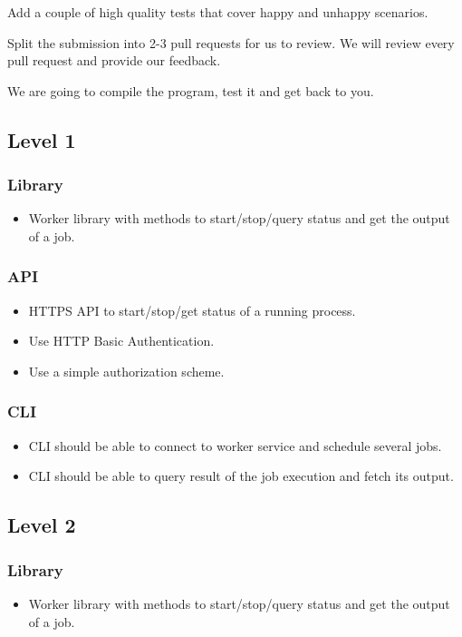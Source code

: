 \documentclass{article}
\begin{document}
  Add a couple of high quality tests that cover happy and unhappy scenarios.

  Split the submission into 2-3 pull requests for us to review. We will review every pull request and provide our feedback.

  We are going to compile the program, test it and get back to you.

 \subsection*{Level 1}

  \subsubsection*{Library}
  \begin{itemize}
  \item[] Worker library with methods to start/stop/query status and get the output of a job.
  \end{itemize}

  \subsubsection*{API}
  \begin{itemize}
  \item[] HTTPS API to start/stop/get status of a running process.
  \item[] Use HTTP Basic Authentication.
  \item[] Use a simple authorization scheme.
  \end{itemize}

  \subsubsection*{CLI}
  \begin{itemize}
  \item[] CLI should be able to connect to worker service and schedule several jobs.
  \item[] CLI should be able to query result of the job execution and fetch its output.
  \end{itemize}

 \subsection*{Level 2}

  \subsubsection*{Library}
  \begin{itemize}
  \item[] Worker library with methods to start/stop/query status and get the output of a job.
  \end{itemize}
\end{document}
